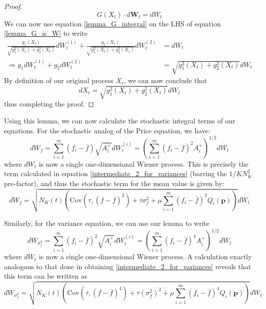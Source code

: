 \begin{proof}
\begin{equation}
	\label{lemma_G_is_W}
	G(X_t) \cdot d\mathbf{W}_t = dW_t
\end{equation}
We can now use equation \eqref{lemma_G_integral} on the LHS of equation \eqref{lemma_G_is_W} to write
\begin{align}
	\frac{g_1(X_t)}{\sqrt{g_1^2(X_t) + g_2^2(X_t)}} dW^{(1)}_t + \frac{g_2(X_t)}{\sqrt{g_1^2(X_t) + g_2^2(X_t)}}dW^{(2)}_t &= dW_t\\
	\Rightarrow g_1 dW^{(1)}_t + g_2dW^{(2)}_t &= \sqrt{g_1^2(X_t) + g_2^2(X_t)}dW_t
\end{align}
By definition of our original process $X_t$, we can now conclude that
\begin{equation}
	dX_t = \sqrt{g_1^2(X_t) + g_2^2(X_t)}dW_t
\end{equation}
thus completing the proof.
\end{proof}
Using this lemma, we can now calculate the stochastic integral terms of our equations. For the stochastic analog of the Price equation, we have:
\begin{equation}
dW_{\overline{f}} = \sum\limits_{i=1}^{m}\left(f_i-\overline{f}\right)\sqrt{A_i^+}dW_{t}^{(i)} = \left(\sum\limits_{i=1}^{m}\left(f_i-\overline{f}\right)^2A_i^+\right)^{1/2}dW_t
\end{equation}
where $dW_t$ is now a single one-dimensional Wiener process. This is precisely the term calculated in equation \eqref{intermediate_2_for_variances} (barring the $1/KN_K^2$ pre-factor), and thus the stochastic term for the mean value is given by:
\begin{equation}
	\label{nD_stoch_Price_noise_term_alt_representation}
	dW_{\overline{f}} = \sqrt{N_K(t) \left(\textrm{Cov}(\tau,\left(f - \overline{f}\right)^2) + \overline{\tau}\sigma^2_{f} +\mu \sum\limits_{i=1}^{m}\left(f_i - \overline{f}\right)^2Q_i(\mathbf{p})\right)}dW_t
\end{equation}

Similarly, for the variance equation, we can use our lemma to write
\begin{equation}
dW_{\sigma^2_f} = \sum\limits_{i=1}^{m}\left(f_i - \overline{f}\right)^2\sqrt{A_i^+}dW_{t}^{(i)} = \left(\sum\limits_{i=1}^{m}\left(f_i - \overline{f}\right)^4 A_i^+\right)^{1/2}dW_t
\end{equation}
where $dW_t$ is now a single one-dimensional Wiener process. A calculation exactly analogous to that done in obtaining \eqref{intermediate_2_for_variances} reveals that this term can be written as
\begin{equation}
	\label{nD_stoch_variance_Price_noise_term_alt_representation}
	dW_{\sigma^2_f} = \sqrt{N_K(t) \left(\textrm{Cov}(\tau,\left(f - \overline{f}\right)^4) + \overline{\tau}(\sigma^2_{f})^2 +\mu \sum\limits_{i=1}^{m}\left(f_i - \overline{f}\right)^4Q_i(\mathbf{p})\right)}dW_t
\end{equation}